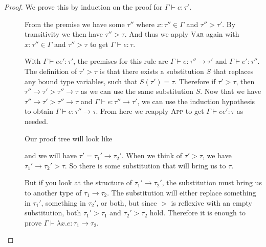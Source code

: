 \begin{proof}
  We prove this by induction on the proof for $\Gamma \vdash e : \tau'$.
  \begin{description}
  \item[\textmd{}]
    From the premise we have some $\tau''$ where $x : \tau'' \in \Gamma$ and $\tau'' >
    \tau'$. By transitivity we then have $\tau'' > \tau$. And thus we apply
    \textsc{Var} again with $x : \tau'' \in \Gamma$ and $\tau'' > \tau$ to get $\Gamma
    \vdash e : \tau$. 
  \item[\textmd{}]
    With $\Gamma \vdash e e' : \tau'$, the premises for this rule are $\Gamma \vdash e : \tau'' \rightarrow \tau'$ and $\Gamma \vdash e' :
    \tau''$.
    The definition of $\tau' > \tau$ is that there exists a
    substitution $S$ that replaces any bound type variables, such that
    $S(\tau') = \tau$.
    Therefore if $\tau' > \tau$, then $\tau'' \rightarrow \tau' > \tau'' \rightarrow \tau$ as we can use the
    same substitution $S$. 
    Now that we have $\tau'' \rightarrow \tau' > \tau'' \rightarrow \tau$ and $\Gamma \vdash e : \tau'' \rightarrow
    \tau'$, we can use the induction hypothesis to obtain $\Gamma \vdash e : \tau'' \rightarrow
    \tau$. From here we reapply \textsc{App} to get $\Gamma \vdash e e' : \tau$ as
    needed.
  \item[\textmd{}]
    Our proof tree will look like
    \begin{mathpar}
    \end{mathpar}
    and we will have $\tau' = \tau_1' \rightarrow \tau_2'$. When we think of $\tau' > \tau$, we
    have $\tau_1' \rightarrow \tau_2' > \tau$. So there is some substitution that will
    bring us to $\tau$.

    But if you look at the structure of $\tau_1' \rightarrow \tau_2'$, the
    substitution must bring us to another type of
    $\tau_1 \rightarrow \tau_2$.  The substitution will either replace something in
    $\tau_1'$, something in $\tau_2'$, or both, but since $>$ is reflexive
    with an empty substitution, both $\tau_1' > \tau_1$ and
    $\tau_2' > \tau_2$ hold. Therefore it is enough to prove $\Gamma \vdash \lambda x . e :
    \tau_1 \rightarrow \tau_2$.


\end{description}
\end{proof}
